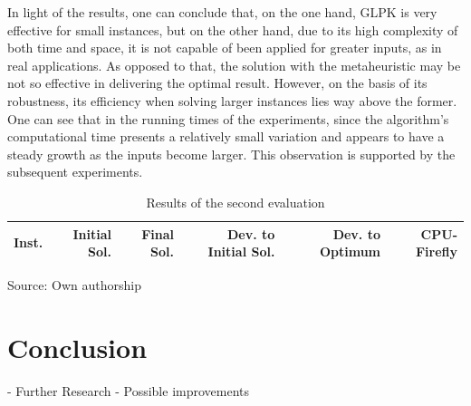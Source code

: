 \documentclass[tuberlin,cic,tc,openright,english,noabntcite,oneside]{iiufrgs}
\begin{document}
In light of the results, one can conclude that, on the one hand, GLPK is very effective for small instances, but on the other hand, due to its high complexity of both time and space, it is not capable of been applied for greater inputs, as in real applications. As opposed to that, the solution with the metaheuristic may be not so effective in delivering the optimal result. However, on the basis of its robustness, its efficiency when solving larger instances lies way above the former. One can see that in the running times of the experiments, since the algorithm's computational time presents a relatively small variation and appears to have a steady growth as the inputs become larger. This observation is supported by the subsequent experiments.

\begin{table}[H]
\centering
\caption{Results of the second evaluation}
\begin{tabular}{l | r | r | r | r | r}
\hline
Inst. & Initial Sol. & Final Sol. & Dev. to Initial Sol. & Dev. to Optimum & CPU-Firefly\\
\hline
\hline
\end{tabular}
\center Source: Own authorship
\label{tab:evaluation-2}
\end{table}

\chapter{Conclusion}
- Further Research
- Possible improvements

% 

% 

\nocite{*}
%
\printbibliography
\end{document}
